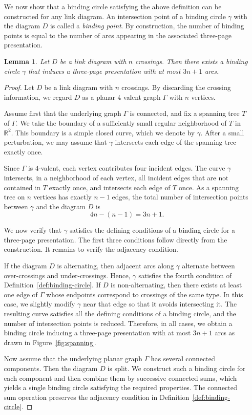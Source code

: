 \documentclass[11pt,a4paper]{amsart}
\newtheorem{lemma}[theorem]{Lemma}
\begin{document}
We now show that a binding circle satisfying the above definition can be constructed for any link diagram.
An intersection point of a binding circle $\gamma$ with the diagram $D$ is called a \textit{binding point}.
By construction, the number of binding points is equal to the number of arcs appearing in the associated three-page presentation.

\begin{lemma} \label{lem:binding-circle-existence}
Let $D$ be a link diagram with $n$ crossings.
Then there exists a binding circle $\gamma$ that induces a three-page presentation with at most $3n+1$ arcs.
\end{lemma}


\begin{proof}
Let $D$ be a link diagram with $n$ crossings.
By discarding the crossing information, we regard $D$ as a planar $4$-valent graph $\Gamma$ with $n$ vertices.

Assume first that the underlying graph $\Gamma$ is connected, and fix a spanning tree $T$ of $\Gamma$.
We take the boundary of a sufficiently small regular neighborhood of $T$ in $\mathbb{R}^2$.
This boundary is a simple closed curve, which we denote by $\gamma$.
After a small perturbation, we may assume that $\gamma$ intersects each edge of the spanning tree exactly once.

Since $\Gamma$ is $4$-valent, each vertex contributes four incident edges.
The curve $\gamma$ intersects, in a neighborhood of each vertex,
all incident edges that are not contained in $T$ exactly once,
and intersects each edge of $T$ once.
As a spanning tree on $n$ vertices has exactly $n-1$ edges,
the total number of intersection points between $\gamma$ and the diagram $D$ is
$$4n-(n-1)=3n+1.$$

We now verify that $\gamma$ satisfies the defining conditions of a binding circle for a three-page presentation.
The first three conditions follow directly from the construction.
It remains to verify the adjacency condition.

If the diagram $D$ is alternating, then adjacent arcs along $\gamma$ alternate between over-crossings and under-crossings.
Hence, $\gamma$ satisfies the fourth condition of Definition~\ref{def:binding-circle}.
If $D$ is non-alternating, then there exists at least one edge of $\Gamma$ whose endpoints correspond to crossings of the same type.
In this case, we slightly modify $\gamma$ near that edge so that it avoids intersecting it.
The resulting curve satisfies all the defining conditions of a binding circle,
and the number of intersection points is reduced.
Therefore, in all cases, we obtain a binding circle inducing a three-page presentation with at most $3n+1$ arcs as drawn in Figure~\ref{fig:spanning}.

Now assume that the underlying planar graph $\Gamma$ has several connected components.
Then the diagram $D$ is split.
We construct such a binding circle for each component and then combine them by successive connected sums,
which yields a single binding circle satisfying the required properties.
The connected sum operation preserves the adjacency condition in Definition~\ref{def:binding-circle}.
\end{proof}
\end{document}
